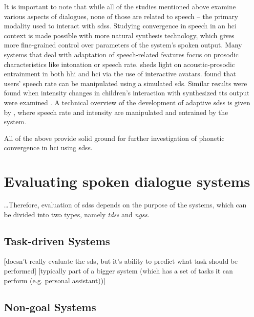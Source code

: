 It is important to note that while all of the studies mentioned above examine various aspects of dialogues, none of those are related to speech -- the primary modality used to interact with \acp{sds}.
Studying convergence in speech in an \ac{hci} context is made possible with more natural synthesis technology, which gives more fine-grained control over parameters of the system's spoken output.
Many systems that deal with adaptation of speech-related features focus on prosodic characteristics like intonation or speech rate.
\citet{Levitan2014acoustic} sheds light on acoustic-prosodic entrainment in both \ac{hhi} and \ac{hci} via the use of interactive avatars.
\citet{Bell2003prosodic} found that users' speech rate can be manipulated using a simulated \ac{sds}.
Similar results were found when intensity changes in children's interaction with synthesized \ac{tts} output were examined \citep{Coulston2002amplitude}.
A technical overview of the development of adaptive \acp{sds} is given by \citet{Levitan2016implementing}, where speech rate and intensity are manipulated and entrained by the system.

All of the above provide solid ground for further investigation of phonetic convergence in \ac{hci} using \acp{sds}.

\section{Evaluating spoken dialogue systems}
\label{sec:evaluation_of_sdss}

\ldots Therefore, evaluation of \acp{sds} depends on the purpose of the systems, which can be divided into two types, namely \textit{\aclp{tds}} and \textit{\aclp{ngs}}.

\subsection{Task-driven Systems}
\label{subsec:task-driven_systems}
[doesn't really evaluate the \ac{sds}, but it's ability to predict what task should be performed]
[typically part of a bigger system (which has a set of tasks it can perform (e.g. personal assistant))]

\subsection{Non-goal Systems}
\label{subsec:non-goal_systems}

